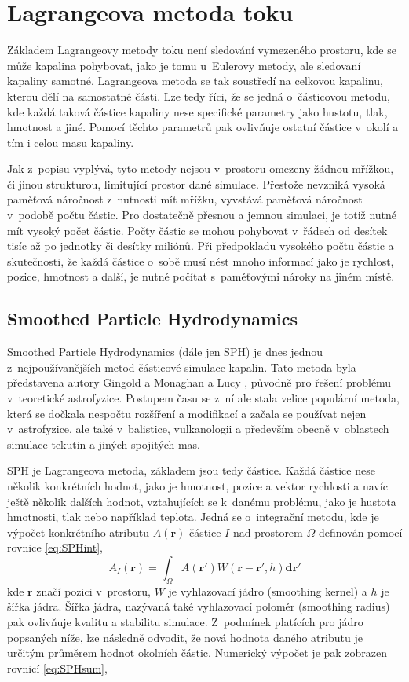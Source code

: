 \section{Lagrangeova metoda toku}
Základem Lagrangeovy metody toku není sledování vymezeného prostoru, kde se může kapalina pohybovat, jako je tomu u~Eulerovy metody, ale sledovaní kapaliny samotné. Lagrangeova metoda se tak soustředí na celkovou kapalinu, kterou dělí na samostatné části. Lze tedy říci, že se jedná o~částicovou metodu, kde každá taková částice kapaliny nese specifické parametry jako hustotu, tlak, hmotnost a jiné. Pomocí těchto parametrů pak ovlivňuje ostatní částice v~okolí a tím i celou masu kapaliny.

Jak z~popisu vyplývá, tyto metody nejsou v~prostoru omezeny žádnou mřížkou, či jinou strukturou, limitující prostor dané simulace. Přestože nevzniká vysoká paměťová náročnost z~nutnosti mít mřížku, vyvstává paměťová náročnost v~podobě počtu částic. Pro dostatečně přesnou a jemnou simulaci, je totiž nutné mít vysoký počet částic. Počty částic se mohou pohybovat v~řádech od desítek tisíc až po jednotky či desítky miliónů. Při předpokladu  vysokého počtu částic a skutečnosti, že každá částice o~sobě musí nést mnoho informací jako je rychlost, pozice, hmotnost a další, je nutné počítat s~paměťovými nároky na jiném místě.

\subsection{Smoothed Particle Hydrodynamics}
\label{chapter:SPH}
Smoothed Particle Hydrodynamics (dále jen SPH) je dnes jednou z~nejpoužívanějších metod částicové simulace kapalin. Tato metoda byla představena autory Gingold a Monaghan \cite{Monaghan77} a Lucy \cite{Lucy77}, původně pro řešení problému v~teoretické astrofyzice. Postupem času se z~ní ale stala velice populární metoda, která se dočkala nespočtu rozšíření a modifikací a začala se používat nejen v~astrofyzice, ale také v~balistice, vulkanologii a především obecně v~oblastech simulace tekutin a jiných spojitých mas.

SPH je Lagrangeova metoda, základem jsou tedy částice. Každá částice nese několik konkrétních hodnot, jako je hmotnost, pozice a vektor rychlosti a navíc ještě několik dalších hodnot, vztahujících se k~danému problému, jako je hustota hmotnosti, tlak nebo například teplota. Jedná se o~integrační metodu, kde je výpočet konkrétního atributu $A(\mathbf{r})$ částice $I$ nad prostorem $\Omega$ definován pomocí rovnice \ref{eq:SPHint},
\begin{equation}
	A_I(\mathbf{r}) = \int_\Omega A(\mathbf{r}')W(\mathbf{r} - \mathbf{r'},h)\mathbf{dr}'
	\label{eq:SPHint}
\end{equation}
kde $\mathbf{r}$ značí pozici v~prostoru, $W$ je vyhlazovací jádro (smoothing kernel) a $h$ je šířka jádra. Šířka jádra, nazývaná také vyhlazovací poloměr (smoothing radius) pak ovlivňuje kvalitu a stabilitu simulace. Z~podmínek platících pro jádro popsaných níže, lze následně odvodit, že nová hodnota daného atributu je určitým průměrem hodnot okolních částic.
Numerický výpočet je pak zobrazen rovnicí \ref{eq:SPHsum},

